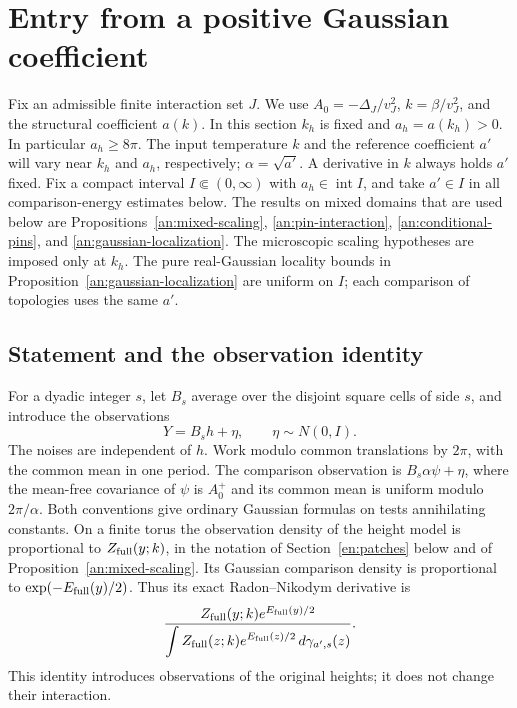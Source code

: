 \section{Entry from a positive Gaussian coefficient}
\label{en:section}

Fix an admissible finite interaction set $J$.  We use
$A_0=-\Delta_J/v_J^2$, $k=\beta/v_J^2$, and the structural coefficient
$a(k)$.  In this section $k_h$ is fixed and $a_h=a(k_h)>0$.
In particular $a_h\geq8\pi$.  The input temperature $k$ and the
reference coefficient $a'$ will vary near $k_h$ and $a_h$, respectively;
$\alpha=\sqrt{a'}$.  A derivative in $k$ always holds $a'$ fixed.
Fix a compact interval $I\Subset(0,\infty)$ with
$a_h\in\operatorname{int}I$, and take $a'\in I$ in all comparison-energy
estimates below.
The results on mixed domains that are used below are
Propositions~\ref{an:mixed-scaling}, \ref{an:pin-interaction},
\ref{an:conditional-pins}, and \ref{an:gaussian-localization}.
The microscopic scaling hypotheses are imposed only at $k_h$.
The pure real-Gaussian locality bounds in
Proposition~\ref{an:gaussian-localization} are uniform on $I$;
each comparison of topologies uses the same $a'$.

\subsection{Statement and the observation identity}

For a dyadic integer $s$, let $B_s$ average over the disjoint square
cells of side $s$, and introduce the observations
\begin{equation}\label{en:observation}
                 Y=B_sh+\eta,\qquad \eta\sim N(0,I).
\end{equation}
The noises are independent of $h$.  Work modulo common translations by
$2\pi$, with the common mean in one period.  The comparison observation
is $B_s\alpha\psi+\eta$, where the mean-free covariance of $\psi$ is
$A_0^+$ and its common mean is uniform modulo $2\pi/\alpha$.
Both conventions give ordinary Gaussian formulas on tests annihilating
constants.  On a finite torus the observation density of the height
model is proportional to $Z_{\rm full}(y;k)$, in the notation of
Section~\ref{en:patches} below and of Proposition~\ref{an:mixed-scaling}.
Its Gaussian comparison density is proportional to
$\exp(-E_{\rm full}(y)/2)$.  Thus its exact Radon--Nikodym derivative is
\begin{equation}\label{en:exact-density}
 \frac{Z_{\rm full}(y;k)e^{E_{\rm full}(y)/2}}
 {\displaystyle\int Z_{\rm full}(z;k)e^{E_{\rm full}(z)/2}
                      \,d\gamma_{a',s}(z)}.
\end{equation}
This identity introduces observations of the original heights; it does
not change their interaction.

